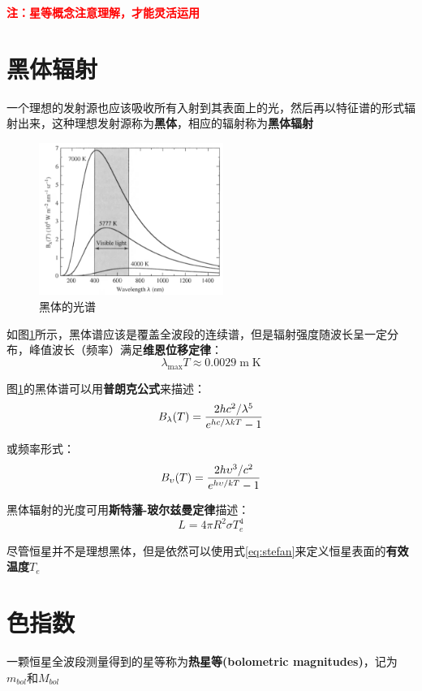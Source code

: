 \documentclass[openany]{ctexbook}
\begin{document}
{\bf \textcolor{red}{注：星等概念注意理解，才能灵活运用}}

\section{黑体辐射}
一个理想的发射源也应该吸收所有入射到其表面上的光，然后再以特征谱的形式辐射出来，这种理想发射源称为{\bf 黑体}，相应的辐射称为{\bf 黑体辐射}
\begin{figure}[hbt]
  \centering
  \includegraphics[width=6cm]{chapters/03/blackbody}
  \caption{黑体的光谱}
  \label{fig:blackbody}
\end{figure}

如图\ref{fig:blackbody}所示，黑体谱应该是覆盖全波段的连续谱，但是辐射强度随波长呈一定分布，峰值波长（频率）满足{\bf 维恩位移定律}：
\begin{equation}
  \lambda_\mathrm{max}T\approx0.0029\;\mathrm{m\;K}
\end{equation}

图\ref{fig:blackbody}的黑体谱可以用{\bf 普朗克公式}来描述：
\begin{equation}
  B_\lambda(T)={2hc^2/\lambda^5 \over e^{hc/\lambda kT}-1}
  \label{eq:planck}
\end{equation}

或频率形式：
\begin{equation}
  B_\upsilon (T)={2h\upsilon^3/c^2 \over e^{h\upsilon/kT}-1}
\end{equation}

黑体辐射的光度可用{\bf 斯特藩-玻尔兹曼定律}描述：
\begin{equation}
  L=4\pi R^2\sigma T^4_e
  \label{eq:stefan}
\end{equation}

尽管恒星并不是理想黑体，但是依然可以使用式\ref{eq:stefan}来定义恒星表面的{\bf 有效温度}$T_e$

\section{色指数}
一颗恒星全波段测量得到的星等称为{\bf 热星等(bolometric magnitudes)}，记为$m_{bol}$和$M_{bol}$
\end{document}
